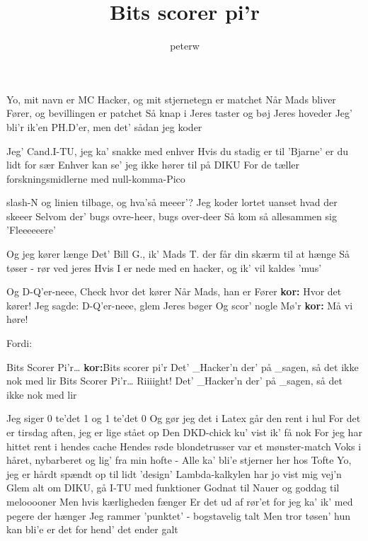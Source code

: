 \documentclass[danish]{article}
\title{Bits scorer pi'r}
\author{peterw}
\begin{document}
\begin{song}

Yo, mit navn er MC Hacker, og mit stjernetegn er matchet
Når Mads bliver Fører, og bevillingen er patchet
Så knap i Jeres taster og bøj Jeres hoveder
Jeg' bli'r ik'en PH.D'er, men det' sådan jeg koder

Jeg' Cand.I-TU, jeg ka' snakke med enhver
Hvis du stadig er til 'Bjarne' er du lidt for sær
Enhver kan se' jeg ikke hører til på DIKU
For de tæller forskningsmidlerne med null-komma-Pico

slash-N og linien tilbage, og hva'så meeer'?
Jeg koder lortet uanset hvad der skeeer
Selvom der' bugs ovre-heer, bugs over-deer
Så kom så allesammen sig 'Fleeeeeere'

Og jeg kører længe
Det' Bill G., ik' Mads T. der får din skærm til at hænge
Så tøser - rør ved jeres 
Hvis I er nede med en hacker, og ik' vil kaldes 'mus'

Og D-Q'er-neee, Check hvor det kører
Når Mads, han er Fører \textbf{kor:} Hvor det kører!
Jeg sagde: D-Q'er-neee, glem Jeres bøger
Og scor' nogle Mø'r \textbf{kor:} Må vi høre!

Fordi:

Bits Scorer Pi'r\ldots{} \textbf{kor:}Bits scorer pi'r
Det' \_Hacker'n der' på \_sagen, så det ikke nok med lir
Bits Scorer Pi'r\ldots{} Riiiight!
Det' \_Hacker'n der' på \_sagen, så det ikke nok med lir


Jeg siger 0 te'det 1 og 1 te'det 0
Og gør jeg det i Latex går den rent i hul
For det er tirsdag aften, jeg er lige stået op
Den DKD-chick ku' vist ik' få nok
For jeg har hittet rent i hendes cache
Hendes røde blondetrusser var et mønster-match
Voks i håret, nybarberet og lig' fra min hofte
- Alle ka' bli'e stjerner her hos Tofte
Yo, jeg er hårdt spændt op til lidt 'design'
Lambda-kalkylen har jo vist mig vej'n
Glem alt om DIKU, gå I-TU med funktioner
Godnat til Nauer og goddag til melooooner
Men hvis kærligheden fænger
Er det ud af rør'et for jeg ka' ik' med pegere der hænger
Jeg rammer 'punktet' - bogstavelig talt
Men tror tøsen' hun kan bli'e er det for hend' det ender galt


\end{song}
\end{document}
